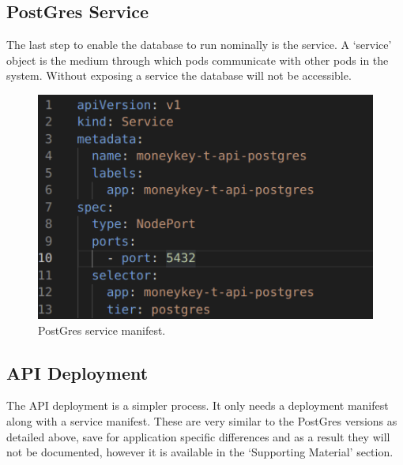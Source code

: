 \begin{flushleft}
    \subsection{PostGres Service}
    The last step to enable the database to run nominally is the service. A `service' object is the medium through which pods communicate with other pods in the system.
    Without exposing a service the database will not be accessible. \newline
    \begin{figure} [ht]
        \begin{center}
            \includegraphics[width=.6\textwidth]{figures/pastgres-service.png}
            \caption{PostGres service manifest.}
            \label{fig: 2.10}
        \end{center}
    \end{figure}
    \subsection{API Deployment}
    The API deployment is a simpler process. It only needs a deployment manifest along with a service manifest. These are very similar to the PostGres versions as detailed above,
    save for application specific differences and as a result they will not be documented, however it is available in the `Supporting Material' section.
    \pagebreak

\end{flushleft}

